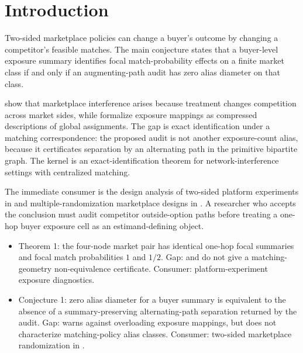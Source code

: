 \documentclass[11pt]{article}
\theoremstyle{definition}
\theoremstyle{plain}
\theoremstyle{remark}
\begin{document}
\section{Introduction}
Two-sided marketplace policies can change a buyer's outcome by changing a competitor's feasible matches.  The main conjecture states that a buyer-level exposure summary identifies focal match-probability effects on a finite market class if and only if an augmenting-path audit has zero alias diameter on that class.

\citet[p. 2539]{JohariLiLiskovichWeintraub2022} show that marketplace interference arises because treatment changes competition across market sides, while \citet[Sec. 2]{AronowSamii2017} formalize exposure mappings as compressed descriptions of global assignments.  The gap is exact identification under a matching correspondence: the proposed audit is not another exposure-count alias, because it certificates separation by an alternating path in the primitive bipartite graph.  The kernel is an exact-identification theorem for network-interference settings with centralized matching.

The immediate consumer is the design analysis of two-sided platform experiments in \citet{JohariLiLiskovichWeintraub2022} and multiple-randomization marketplace designs in \citet{MasoeroEtAl2026}.  A researcher who accepts the conclusion must audit competitor outside-option paths before treating a one-hop buyer exposure cell as an estimand-defining object.

\begin{itemize}[leftmargin=*]
\item Theorem 1: the four-node market pair has identical one-hop focal summaries and focal match probabilities \(1\) and \(1/2\). Gap: \citet{JohariLiLiskovichWeintraub2022} and \citet{AronowSamii2017} do not give a matching-geometry non-equivalence certificate. Consumer: platform-experiment exposure diagnostics.
\item Conjecture 1: zero alias diameter for a buyer summary is equivalent to the absence of a summary-preserving alternating-path separation returned by the audit. Gap: \citet{Savje2024} warns against overloading exposure mappings, but does not characterize matching-policy alias classes. Consumer: two-sided marketplace randomization in \citet{MasoeroEtAl2026}.
\end{itemize}
\end{document}
